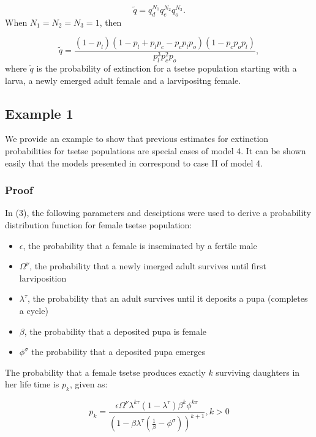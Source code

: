 \documentclass[smallextended]{svjour3}
\begin{document}
$$\tilde{q} = q_{d}^{N_1}q_{e}^{N_2}q_{o}^{N_3}.$$ When $N_1 = N_2 =N_3=1$, then

\begin{equation}
\label{jointextinction}
\tilde{q} = \frac{(1-p_{l})(1- p_{l}+p_{l}p_{c} - p_{c}p_{l}p_{o})(1-p_{c}p_{o}p_{l})}{p_{l}^{3}p_{c}^{2}p_{o}},
\end{equation} 
where $\tilde{q}$ is the probability of extinction for a tsetse population starting with a larva, a newly emerged adult female and a larvipositng female.  

\subsection{Example 1}

We provide an example to show that previous estimates for extinction probabilities for tsetse populations are special cases of model 4. It can be shown easily that the models presented in \cite{Hargrove2005a,Kajunguri2019,Are2019} correspond to case II of model 4. 

\subsubsection*{Proof}

In (3), the following parameters and desciptions were used to derive a probability distribution function for female tsetse population: 
\begin{itemize}
	\item $\epsilon$, the probability that a female is inseminated by a fertile male 
	\item $\Omega^{\nu}$,  the probability that a newly imerged adult survives until first larviposition
	\item $ \lambda^{\tau}$, the probability that an adult survives until it deposits a pupa (completes a cycle)
	\item $\beta$,  the probability that a deposited pupa is female 
	\item $\phi^{\sigma}$  the probability that a deposited pupa emerges
\end{itemize}

The probability that a female tsetse produces exactly $k$ surviving daughters in her life time is $p_{k}$, given as:

\begin{equation}
\label{Johnframework}
p_{k}= \frac{\epsilon \Omega^{\nu}\lambda^{k\tau}(1-\lambda^{\tau})\beta^{k}\phi^{k\sigma}}{(1-\beta \lambda^\tau(\frac{1}{\beta} -\phi^{\sigma}))^{k+1}},   k>0   
\end{equation}
\end{document}
